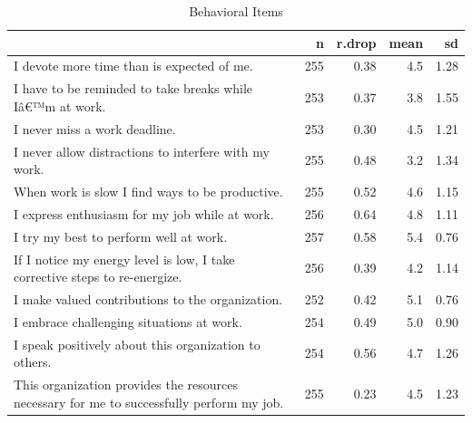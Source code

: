 \documentclass[
]{book}
\begin{document}
\begin{table}

\caption{\label{tab:rdrop2}Behavioral Items}
\centering
\begin{tabular}[t]{l|r|r|r|r}
\hline
  & n & r.drop & mean & sd\\
\hline
I devote more time than is expected of me. & 255 & 0.38 & 4.5 & 1.28\\
\hline
I have to be reminded to take breaks while Iâ€™m at work. & 253 & 0.37 & 3.8 & 1.55\\
\hline
I never miss a work deadline. & 253 & 0.30 & 4.5 & 1.21\\
\hline
I never allow distractions to interfere with my work. & 255 & 0.48 & 3.2 & 1.34\\
\hline
When work is slow I find ways to be productive. & 255 & 0.52 & 4.6 & 1.15\\
\hline
I express enthusiasm for my job while at work. & 256 & 0.64 & 4.8 & 1.11\\
\hline
I try my best to perform well at work. & 257 & 0.58 & 5.4 & 0.76\\
\hline
If I notice my energy level is low, I take corrective steps to re-energize. & 256 & 0.39 & 4.2 & 1.14\\
\hline
I make valued contributions to the organization. & 252 & 0.42 & 5.1 & 0.76\\
\hline
I embrace challenging situations at work. & 254 & 0.49 & 5.0 & 0.90\\
\hline
I speak positively about this organization to others. & 254 & 0.56 & 4.7 & 1.26\\
\hline
This organization provides the resources necessary for me to successfully perform my job. & 255 & 0.23 & 4.5 & 1.23\\
\hline
\end{tabular}
\end{table}
\end{document}
